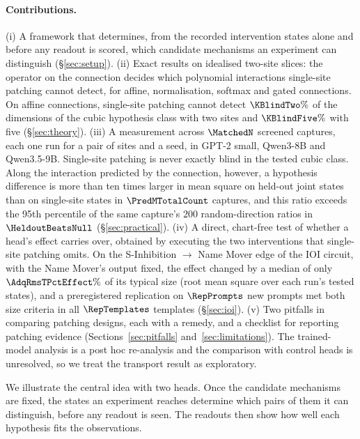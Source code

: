 \documentclass{article}
\theoremstyle{plain}
\theoremstyle{definition}
\begin{document}
\paragraph{Contributions.} (i) A framework that determines, from the recorded intervention states alone and before
any readout is scored, which candidate mechanisms an experiment can distinguish (\S\ref{sec:setup}). (ii) Exact
results on idealised two-site slices: the operator on the connection decides which polynomial interactions single-site
patching cannot detect, for affine, normalisation, softmax and gated connections. On affine connections, single-site
patching cannot detect $\KBlindTwo\%$ of the dimensions of the cubic hypothesis class with two sites and
$\KBlindFive\%$ with five (\S\ref{sec:theory}). (iii) A measurement across $\MatchedN$ screened captures, each one run
for a pair of sites and a seed, in GPT-2 small, Qwen3-8B and Qwen3.5-9B. Single-site patching is never exactly blind in
the tested cubic class. Along the interaction predicted by the connection, however, a hypothesis difference is more
than ten times larger in mean square on held-out joint states than on single-site states in $\PredMTotalCount$
captures, and this ratio exceeds the 95th percentile of the same capture's $200$ random-direction ratios in
$\HeldoutBeatsNull$ (\S\ref{sec:practical}). (iv) A direct, chart-free test of whether a head's effect carries over,
obtained by executing the two interventions that single-site patching omits. On the S-Inhibition $\to$ Name Mover edge
of the IOI circuit, with the Name Mover's output fixed, the effect changed by a median of only
$\AdqRmsTPctEffect\%$ of its typical size (root mean square over each run's tested states), and a preregistered
replication on $\RepPrompts$ new prompts met both size criteria in all $\RepTemplates$ templates (\S\ref{sec:ioi}).
(v) Two pitfalls in comparing patching designs, each with a remedy, and a checklist for reporting patching evidence
(Sections~\ref{sec:pitfalls} and~\ref{sec:limitations}). The trained-model analysis is a post hoc re-analysis and the
comparison with control heads is unresolved, so we treat the transport result as exploratory.

We illustrate the central idea with two heads. Once the candidate mechanisms are fixed, the states an experiment
reaches determine which pairs of them it can distinguish, before any readout is seen. The readouts then show how well each hypothesis fits
the observations.
\end{document}
